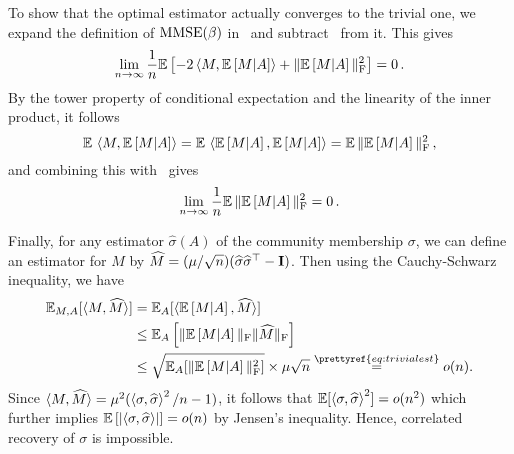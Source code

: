 To show that the optimal estimator actually converges to the trivial one, we expand the definition of ${\rm MMSE}(\beta)$ in~ and subtract~ from it.  This gives
\begin{equation}
\lim_{n \to \infty} \frac{1}{n} \mathbb{E}\left[  - 2\left \langle M, \mathbb{E}\left[ M|A \right]  \right\rangle + \| \mathbb{E}\left[ M|A \right] \|_{\rm F}^2 \right] = 0 \, . 
\label{eq:mmse-2}
\end{equation}
By the tower property of conditional expectation and the linearity of the inner product, it follows 
$$
	\mathbb{E} \, \left \langle M, \mathbb{E}\left[ M|A \right]  \right\rangle
 	= \mathbb{E} \, \left \langle \mathbb{E}\left[ M|A \right], \mathbb{E}\left[ M|A \right] \right\rangle
 	= \mathbb{E} \, \| \mathbb{E}\left[  M|A \right] \|_{\rm F}^2 \, ,
$$
and combining this with~ gives
\begin{equation}
\label{eq:trivialest}
	\lim_{n \to \infty} \frac{1}{n} \mathbb{E} \, \| \mathbb{E}\left[ M|A \right] \|_{\rm F}^2 = 0 \, .
\end{equation}

Finally, for any estimator $\hat{\sigma}(A)$ of the community membership $\sigma$, we can define an estimator for $M$ by
$\widehat{M} = (\mu/\sqrt{n} ) ( \widehat{\sigma} \widehat{\sigma}^\top - \mathbf I)$.
Then using the Cauchy-Schwarz inequality, we have
\begin{align*}
	\Exp_{M, A} [\Iprod{M}{\hat{M}}] & = \Exp_{A} [\Iprod{ \expect{M|A} }{\hat{M}}]  \\
	& \le   \Exp_{A} \left[ \| \expect{M|A} \|_{\rm F} \| \hat{M}\|_{\rm F}  \right] \\
	& \le  \sqrt{ \Exp_{A} [ \| \expect{M|A} \|^2_{\rm F} ] } \times \mu\sqrt{n} \overset{\prettyref{eq:trivialest}}{=} o(n).
\end{align*}
Since $\langle M, \widehat{M} \rangle = \mu^2 ( \left \langle \sigma, \widehat{\sigma} \right\rangle^2/n -1 )$, it follows
that $\mathbb{E}[\left \langle \sigma, \widehat \sigma \right\rangle^2]=o(n^2)$ which further implies 
$ \mathbb{E}\left[ \left| \left \langle \sigma, \widehat \sigma \right\rangle \right| \right]=o(n)$ by Jensen's inequality. 
Hence, correlated recovery of
$\sigma$ is impossible. 







